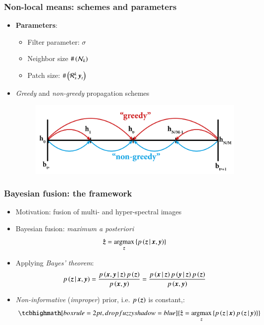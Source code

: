 \documentclass{beamer}
\let\olditem\item
\renewcommand{\item}{\setlength{\itemsep}{\fill}\olditem}
\begin{document}
\begin{frame}
\frametitle{Non-local means: schemes and parameters}
	\begin{itemize}
		\item \textbf{Parameters}: 
			\begin{itemize}
				\item Filter parameter: $ \sigma $
				\item Neighbor size $ \# \left( \mathcal{N}_k \right)$
				\item Patch size: $ \# \left(\mathcal{R}_s^k\operatorname{\boldsymbol{y}}_t\right) $
			\end{itemize}	
		\item \emph{Greedy} and \emph{non-greedy} propagation schemes
		\begin{figure}
		\centering
			\includegraphics[width=0.8\columnwidth]{./figures/NLM/propagation_scheme.png}
			\vspace{-0.3cm}
		\end{figure}	
	\end{itemize}
\end{frame}

\begin{frame}
\frametitle{Bayesian fusion: the framework}
	\begin{itemize}\itemsep0em
		\item Motivation: fusion of multi- and hyper-spectral images {\footnotesize \cite{hardie2004map}}
		\item Bayesian fusion:  \textit{maximum a posteriori}
		\begin{equation*}
		 \hat{\operatorname{\boldsymbol{z}}}=\operatorname*{\arg\!\max}_{\operatorname{\boldsymbol{z}}} \left\lbrace  p \left(\operatorname{\boldsymbol{z}}|\operatorname{\boldsymbol{x}},\operatorname{\boldsymbol{y}}\right) \right\rbrace 
		\end{equation*} 

		\item Applying \emph{Bayes' theorem}:
		\begin{equation*}
			p\left(\operatorname{\boldsymbol{z}}|\operatorname{\boldsymbol{x}},\operatorname{\boldsymbol{y}}\right) = \frac{p\left( \operatorname{\boldsymbol{x}},\operatorname{\boldsymbol{y}}|\operatorname{\boldsymbol{z}}\right)p\left( \operatorname{\boldsymbol{z}}\right)}{p\left( \operatorname{\boldsymbol{x}},\operatorname{\boldsymbol{y}}\right)} = \frac{p\left( \operatorname{\boldsymbol{x}}|\operatorname{\boldsymbol{z}}\right) p\left( \operatorname{\boldsymbol{y}}|\operatorname{\boldsymbol{z}}\right) p\left( \operatorname{\boldsymbol{z}}\right) }{p\left( \operatorname{\boldsymbol{x}},\operatorname{\boldsymbol{y}}\right)}
		\end{equation*} 	
		 
		\item \emph{Non-informative} (\emph{improper}) prior, i.e. $ p\left( \operatorname{\boldsymbol{z}}\right) $ is constant,: 
		\begin{equation*}
				\tcbhighmath[boxrule=2pt,drop fuzzy shadow=blue]{\hat{\z} = \argmax_{\z}\left\lbrace p\left( \z|\x\right) p\left( \z|\y\right)\right\rbrace}
		\end{equation*} 	
	\end{itemize}
\end{frame}
\end{document}
